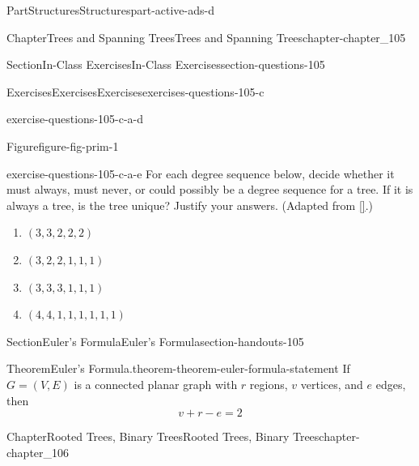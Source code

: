 \documentclass[oneside,10pt,]{book}
\newcommand{\xreffont}{\relax}
\numberwithin{equation}{section}
\begin{document}
\begin{partptx}{Part}{Structures}{}{Structures}{}{}{part-active-ads-d}
\begin{chapterptx}{Chapter}{Trees and Spanning Trees}{}{Trees and Spanning Trees}{}{}{chapter-chapter_105}
\begin{sectionptx}{Section}{In-Class Exercises}{}{In-Class Exercises}{}{}{section-questions-105}
\begin{exercises-subsection-numberless}{Exercises}{Exercises}{}{Exercises}{}{}{exercises-questions-105-c}
\begin{exercisegroup}
\begin{divisionexerciseeg}{4}{}{}{exercise-questions-105-c-a-d}
\begin{figureptx}{Figure}{}{figure-fig-prim-1}{}
\begin{image}{0.175}{0.65}{0.175}{}
\end{image}%
\tcblower
\end{figureptx}%
\end{divisionexerciseeg}%
\begin{divisionexerciseeg}{5}{}{}{exercise-questions-105-c-a-e}%
For each degree sequence below, decide whether it must always, must never, or could possibly be a degree sequence for a tree.  If it is always a tree, is the tree unique?  Justify your answers. (Adapted from \hyperlink{biblio-biblio-levin-2020}{[{\xreffont 3}]}.)%
\begin{enumerate}[label=(\alph*)]
\item{}\(\displaystyle (3, 3, 2, 2, 2)\)%
\item{}\(\displaystyle (3, 2, 2, 1, 1, 1)\)%
\item{}\(\displaystyle (3, 3, 3, 1, 1, 1)\)%
\item{}\(\displaystyle (4, 4, 1, 1, 1, 1, 1, 1)\)%
\end{enumerate}
%
\end{divisionexerciseeg}%
\end{exercisegroup}
\par\medskip\noindent
\end{exercises-subsection-numberless}
\end{sectionptx}
%
%
\typeout{************************************************}
\typeout{************************************************}
%
\begin{sectionptx}{Section}{Euler's Formula}{}{Euler's Formula}{}{}{section-handouts-105}
\begin{theorem}{Theorem}{Euler's Formula.}{}{theorem-theorem-euler-formula-statement}%
%
If \(G = (V, E)\) is a connected planar graph with \(r\) regions, \(v\) vertices, and \(e\) edges, then%
\begin{equation*}
v + r - e = 2
\end{equation*}
%
\end{theorem}
\end{sectionptx}
\end{chapterptx}
%
\typeout{************************************************}
\typeout{************************************************}
%
\begin{chapterptx}{Chapter}{Rooted Trees, Binary Trees}{}{Rooted Trees, Binary Trees}{}{}{chapter-chapter_106}
\renewcommand*{\chaptername}{Chapter}
\index{}%
%
%
\typeout{************************************************}

\end{chapterptx}
\end{partptx}
\end{document}
